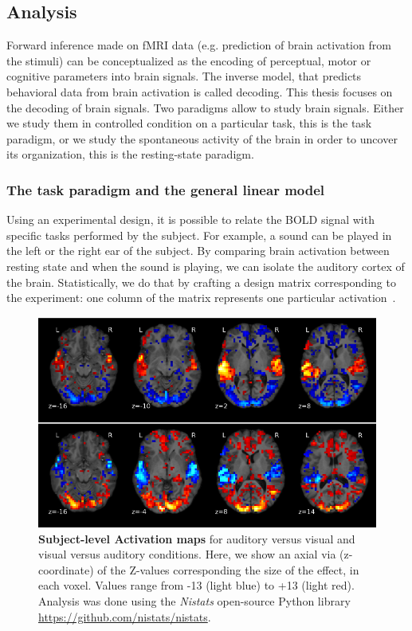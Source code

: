 \subsection{Analysis}
\label{sec:glm}
Forward inference made on fMRI data (e.g. prediction of brain
activation from the stimuli) can be conceptualized as the encoding of perceptual,
motor or cognitive parameters into brain signals. The inverse model, that
predicts behavioral data from brain activation is called decoding. This thesis
focuses on the decoding of brain signals. Two paradigms allow to study brain
signals. Either we study them in controlled condition on a particular task,
this is the task paradigm, or we study the spontaneous activity of the brain in
order to uncover its organization, this is the resting-state paradigm.

\subsubsection{The task paradigm and the general linear model}
Using an experimental design, it is possible to relate the BOLD signal with
specific tasks performed by the subject. For example, a sound can be played in
the left or the right ear of the subject. By comparing brain activation between
resting state and when the sound is playing, we can isolate the auditory cortex
of the brain.
Statistically, we do that by crafting a design matrix corresponding to the
experiment: one column of the matrix represents one particular activation~\citep{friston1994statistical}.

\begin{figure}
  \includegraphics[width=1\linewidth]{figures/activation.png}
  \caption{\textbf{Subject-level Activation maps } for auditory versus visual and visual versus auditory conditions. Here, we show an axial via (z-coordinate) of the Z-values corresponding the size of the effect, in each voxel. Values range from -13 (light blue) to +13 (light red). Analysis was done using the \textit{Nistats} open-source Python library \url{https://github.com/nistats/nistats}.}
\end{figure}

